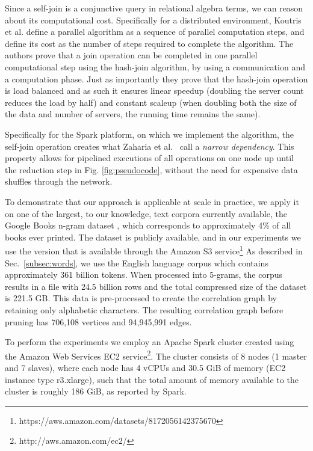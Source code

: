 \documentclass{sig-alternate}
\begin{document}
Since a self-join is a conjunctive query \cite{Chandra77} in relational algebra terms,
we can reason about its computational cost.
Specifically for a distributed environment, Koutris et al. \cite{koutris2011conjuctive}
define a parallel algorithm as a sequence of parallel computation steps, and define its
cost as the number of steps required to complete the algorithm.
The authors prove that a join operation can be completed in one parallel computational
step using the hash-join algorithm, by using a communication and a computation phase.
Just as importantly they prove that the hash-join operation is load balanced
and as such it ensures linear speedup (doubling the server count reduces the load by
half) and constant scaleup (when doubling both the size of the data and number of servers, the running time remains the same).

Specifically for the Spark platform, on which we implement the algorithm,
the self-join operation creates what Zaharia et al.\ \cite{Zaharia-2012}
call a \textit{narrow dependency}. This property allows for pipelined executions
of all operations on one node up until the reduction step in Fig. \ref{fig:pseudocode}, without the need for expensive data shuffles
through the network.

To demonstrate that our approach is applicable at scale in practice, we apply it on one of the largest, to our knowledge,
text corpora currently available, the Google Books
n-gram dataset \cite{Michel10,Lin12}, which corresponds to approximately 4\% of all books ever printed.
The dataset is publicly available, and in our experiments we use
the version that is available through the Amazon S3 service\footnote{https://aws.amazon.com/datasets/8172056142375670}
As described in Sec.\ \ref{subsec:words}, we use the English language corpus
which contains approximately 361 billion tokens. When processed into 5-grams, the corpus results in a file with 24.5 billion rows and the total compressed size of the dataset
is 221.5 GB. This data is pre-processed to create the correlation graph by retaining
only alphabetic characters. The resulting correlation graph before pruning has 706,108 vertices and 94,945,991 edges.

To perform the experiments we employ an Apache Spark cluster created using the Amazon
Web Services EC2 service\footnote{http://aws.amazon.com/ec2/}.
The cluster consists of 8 nodes (1 master and 7 slaves), where each node has 4 vCPUs and
30.5 GiB of memory (EC2 instance type r3.xlarge), such that the total amount of memory available to the cluster
is roughly 186 GiB, as reported by Spark.
\end{document}
